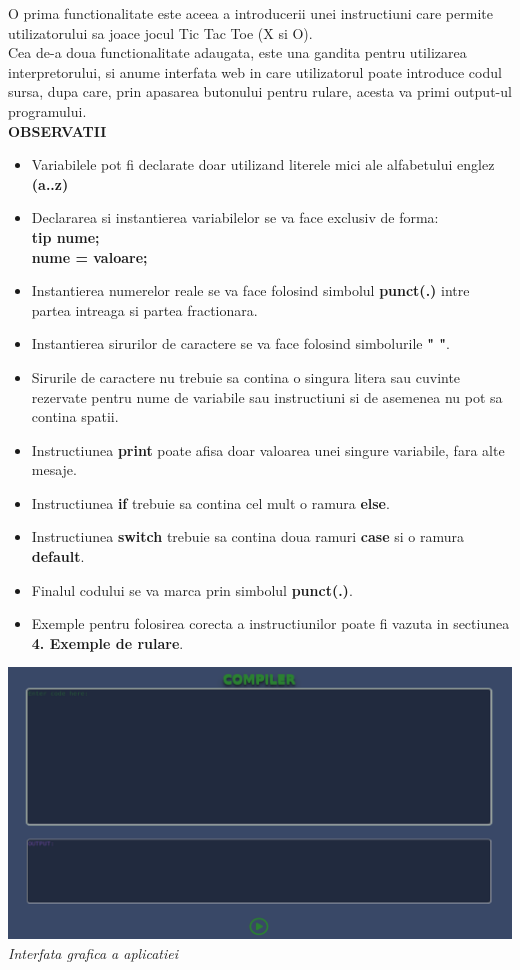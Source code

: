 \documentclass{article}
\begin{document}
O prima functionalitate este aceea a introducerii unei instructiuni care permite utilizatorului sa joace jocul Tic Tac Toe (X si O).\\

Cea de-a doua functionalitate adaugata, este una gandita pentru utilizarea interpretorului, si anume interfata web in care utilizatorul poate introduce codul sursa, dupa care, prin apasarea butonului pentru rulare, acesta va primi output-ul programului.\\

\textbf{OBSERVATII}
\begin{itemize}
    \item Variabilele pot fi declarate doar utilizand literele mici ale alfabetului englez \textbf{(a..z)}
    \item Declararea si instantierea variabilelor se va face exclusiv de forma:
    \textbf{\\tip nume; \\nume = valoare;}
    \item Instantierea numerelor reale se va face folosind simbolul \textbf{punct(.)} intre partea intreaga si partea fractionara.
    \item Instantierea sirurilor de caractere se va face folosind simbolurile \textbf{" "}.
    \item Sirurile de caractere nu trebuie sa contina o singura litera sau cuvinte rezervate pentru nume de variabile sau instructiuni si de asemenea nu pot sa contina spatii.
    \item Instructiunea \textbf{print} poate afisa doar valoarea unei singure variabile, fara alte mesaje.
    \item Instructiunea \textbf{if} trebuie sa contina cel mult o ramura \textbf{else}.
    \item Instructiunea \textbf{switch} trebuie sa contina doua ramuri \textbf{case} si o ramura \textbf{default}.
    \item Finalul codului se va marca prin simbolul \textbf{punct(.)}.
    \item Exemple pentru folosirea corecta a instructiunilor poate fi vazuta in sectiunea \textbf{4. Exemple de rulare}.
\end{itemize}

\begin{center}
\includegraphics[scale = 0.4]{interfata grafica.png}\\
\textit{Interfata grafica a aplicatiei}
\end{center}
\end{document}
